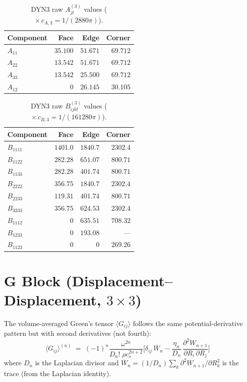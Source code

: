 \documentclass[11pt,a4paper]{article}
\theoremstyle{plain}
\theoremstyle{remark}
\begin{document}
\begin{table}[ht]
\centering
\caption{DYN3 raw $A^{(3)}_{jl}$ values ($\times\, c_{A,3} = 1/(2880\pi)$).}
\label{tab:dyn3-A}
\begin{tabular}{l*{3}{r}}
\toprule
Component & Face & Edge & Corner \\
\midrule
$A_{11}$ & $35.100$ & $51.671$ & $69.712$ \\
$A_{22}$ & $13.542$ & $51.671$ & $69.712$ \\
$A_{33}$ & $13.542$ & $25.500$ & $69.712$ \\
$A_{12}$ & $0$ & $26.145$ & $30.105$ \\
\bottomrule
\end{tabular}
\end{table}

\begin{table}[ht]
\centering
\caption{DYN3 raw $B^{(3)}_{ijkl}$ values ($\times\, c_{B,3} = 1/(161280\pi)$).}
\label{tab:dyn3-B}
\begin{tabular}{l*{3}{r}}
\toprule
Component & Face & Edge & Corner \\
\midrule
$B_{1111}$ & $1401.0$ & $1840.7$ & $2302.4$ \\
$B_{1122}$ & $282.28$ & $651.07$ & $800.71$ \\
$B_{1133}$ & $282.28$ & $401.74$ & $800.71$ \\
$B_{2222}$ & $356.75$ & $1840.7$ & $2302.4$ \\
$B_{2233}$ & $119.31$ & $401.74$ & $800.71$ \\
$B_{3333}$ & $356.75$ & $624.53$ & $2302.4$ \\
$B_{1112}$ & $0$ & $635.51$ & $708.32$ \\
$B_{1233}$ & $0$ & $193.08$ & --- \\
$B_{1123}$ & $0$ & $0$ & $269.26$ \\
\bottomrule
\end{tabular}
\end{table}


\section{G Block (Displacement--Displacement, $3\times 3$)}
\label{sec:G-block}

The volume-averaged Green's tensor $\langle G_{ij}\rangle$ follows
the same potential-derivative pattern but with second derivatives
(not fourth):
\begin{equation}
  \boxed{
  \langle G_{ij}\rangle^{(n)} \;=\;
  (-1)^n \frac{\omega^{2n}}{D_n!\;\rho c_s^{2n+2}}
  \biggl[
    \delta_{ij}\,\overline{W}_n
  - \frac{\eta_n}{D_n}\,
    \frac{\partial^2 W_{n+1}}{\partial R_i\,\partial R_j}
  \biggr]
  }
  \label{eq:Gij-assembly}
\end{equation}
where $D_n$ is the Laplacian divisor and
$\overline{W}_n = (1/D_n)\sum_k \partial^2 W_{n+1}/\partial R_k^2$
is the trace (from the Laplacian identity).
\end{document}
